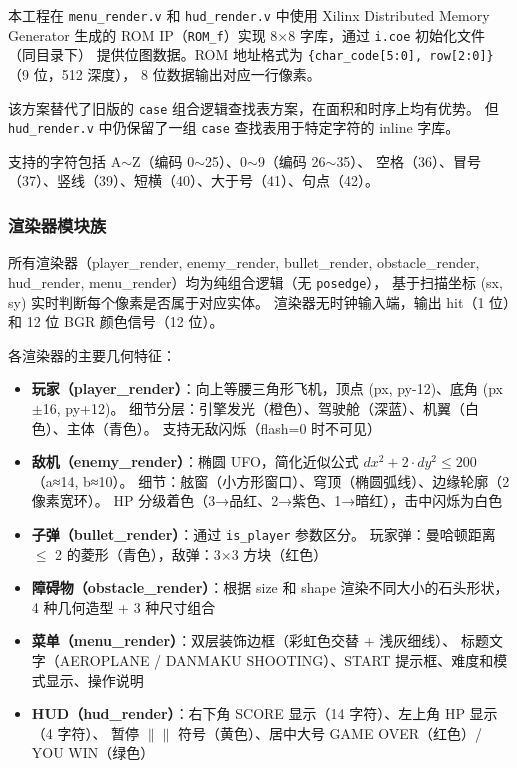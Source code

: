 \documentclass[12pt,a4paper]{ctexart}
\begin{document}
本工程在 \texttt{menu\_render.v} 和 \texttt{hud\_render.v} 中使用 Xilinx Distributed Memory Generator
生成的 ROM IP（\texttt{ROM\_f}）实现 8$\times$8 字库，通过 \texttt{i.coe} 初始化文件（同目录下）
提供位图数据。ROM 地址格式为 \texttt{\{char\_code[5:0], row[2:0]\}}（9 位，512 深度），
8 位数据输出对应一行像素。

该方案替代了旧版的 \texttt{case} 组合逻辑查找表方案，在面积和时序上均有优势。
但 \texttt{hud\_render.v} 中仍保留了一组 \texttt{case} 查找表用于特定字符的 inline 字库。

支持的字符包括 A$\sim$Z（编码 0$\sim$25）、0$\sim$9（编码 26$\sim$35）、
空格（36）、冒号（37）、竖线（39）、短横（40）、大于号（41）、句点（42）。

\subsubsection{渲染器模块族}

所有渲染器（player\_render, enemy\_render, bullet\_render, obstacle\_render,
hud\_render, menu\_render）均为纯组合逻辑（无 \texttt{posedge}），
基于扫描坐标 (sx, sy) 实时判断每个像素是否属于对应实体。
渲染器无时钟输入端，输出 hit（1 位）和 12 位 BGR 颜色信号（12 位）。

各渲染器的主要几何特征：
\begin{itemize}
    \item \textbf{玩家（player\_render）}：向上等腰三角形飞机，顶点 (px, py-12)、底角 (px$\pm$16, py+12)。
    细节分层：引擎发光（橙色）、驾驶舱（深蓝）、机翼（白色）、主体（青色）。
    支持无敌闪烁（flash=0 时不可见）
    \item \textbf{敌机（enemy\_render）}：椭圆 UFO，简化近似公式 $dx^2 + 2\cdot dy^2 \le 200$（a≈14, b≈10）。
    细节：舷窗（小方形窗口）、穹顶（椭圆弧线）、边缘轮廓（2 像素宽环）。
    HP 分级着色（3→品红、2→紫色、1→暗红），击中闪烁为白色
    \item \textbf{子弹（bullet\_render）}：通过 \texttt{is\_player} 参数区分。
    玩家弹：曼哈顿距离 $\le$ 2 的菱形（青色），敌弹：3$\times$3 方块（红色）
    \item \textbf{障碍物（obstacle\_render）}：根据 size 和 shape 渲染不同大小的石头形状，
    4 种几何造型 + 3 种尺寸组合
    \item \textbf{菜单（menu\_render）}：双层装饰边框（彩虹色交替 + 浅灰细线）、
    标题文字（AEROPLANE / DANMAKU SHOOTING）、START 提示框、难度和模式显示、操作说明
    \item \textbf{HUD（hud\_render）}：右下角 SCORE 显示（14 字符）、左上角 HP 显示（4 字符）、
    暂停 $\|$$\|$ 符号（黄色）、居中大号 GAME OVER（红色）/ YOU WIN（绿色）
\end{itemize}
\end{document}
